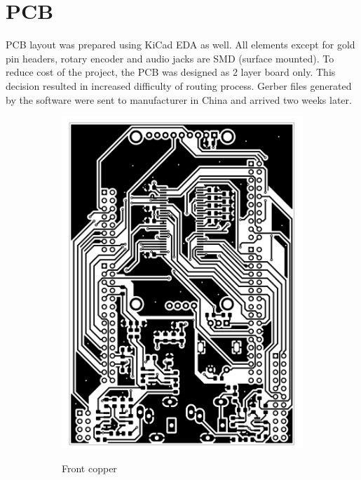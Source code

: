 \documentclass[a4paper,twoside,12pt]{book}
\begin{document}
\section{PCB}
PCB layout was prepared using KiCad EDA as well.
All elements except for gold pin headers,
rotary encoder and audio jacks are SMD (surface mounted).
To reduce cost of the project, the PCB was designed as 2 layer board only.
This decision resulted in increased difficulty of routing process.
Gerber files generated by the software were sent to manufacturer in China
and arrived two weeks later.

\begin{figure}[H]
    \centering
    \begin{subfigure}[h]{0.3\textwidth}
        \includegraphics[width=\textwidth]{images/Board_front}
        \label{fig:board1}
        \caption{Front copper}
    \end{subfigure}
    ~
    \begin{subfigure}[h]{0.3\textwidth}

\end{subfigure}
\end{figure}
\end{document}
